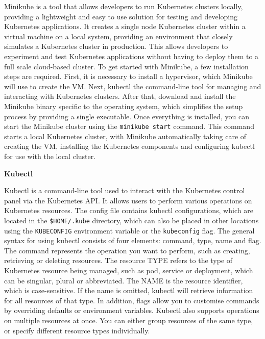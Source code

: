 Minikube is a tool that allows developers to run Kubernetes clusters locally, providing a lightweight and easy to use solution for testing and developing Kubernetes applications. It creates a single node Kubernetes cluster within a virtual machine  on a local system, providing an environment that closely simulates a Kubernetes cluster in production. This allows developers to experiment and test Kubernetes applications without having to deploy them to a full scale cloud-based cluster. To get started with Minikube, a few installation steps are required. First, it is necessary to install a hypervisor, which Minikube will use to create the VM. Next, kubectl the command-line tool for managing and interacting with Kubernetes clusters. After that, download and install the Minikube binary specific to the operating system, which simplifies the setup process by providing a single executable. Once everything is installed, you can start the Minikube cluster using the \texttt{minikube start} command. This command starts a local Kubernetes cluster, with Minikube automatically taking care of creating the VM, installing the Kubernetes components and configuring kubectl for use with the local cluster. \cite{sayfan2019hands}

\textbf{Kubectl}


Kubectl is a command-line tool used to interact with the Kubernetes control panel via the Kubernetes API. It allows users to perform various operations on Kubernetes resources. The config file contains kubectl configurations, which are located in the \texttt{\$HOME/.kube} directory, which can also be placed in other locations using the \texttt{KUBECONFIG} environment variable or the \texttt{kubeconfig} flag. The general syntax for using kubectl consists of four elements: command, type, name and flag. The command represents the operation you want to perform, such as creating, retrieving or deleting resources. The resource TYPE refers to the type of Kubernetes resource being managed, such as pod, service or deployment, which can be singular, plural or abbreviated. The NAME is the resource identifier, which is case-sensitive. If the name is omitted, kubectl will retrieve information for all resources of that type. In addition, flags allow you to customise commands by overriding defaults or environment variables. Kubectl also supports operations on multiple resources at once. You can either group resources of the same type, or specify different resource types individually. \cite{Kubernetes_doc}

